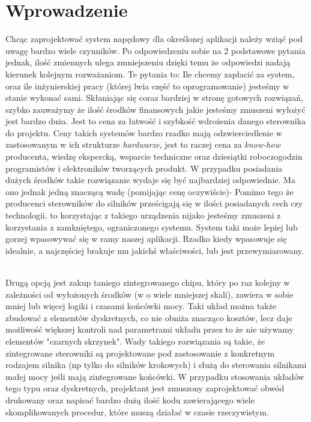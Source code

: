 \section*{Wprowadzenie}
Chcąc zaprojektować system napędowy dla określonej aplikacji należy wziąć pod uwagę bardzo wiele czynników. Po odpowiedzeniu sobie na 2 podstawowe pytania jednak, ilość zmiennych ulega zmniejszeniu dzięki temu że odpowiedzi nadają kierunek kolejnym rozważaniom. Te pytania to: Ile chcemy zapłacić za system, oraz ile inżynierskiej pracy (której lwia część to oprogramowanie) jesteśmy w stanie wykonać sami. Skłaniając się coraz bardziej w stronę gotowych rozwiązań, szybko zauważymy że ilość środków finansowych jakie jesteśmy zmuszeni wyłożyć jest bardzo duża. Jest to cena za łatwość i szybkość wdrożenia danego sterownika do projektu. Ceny takich systemów bardzo rzadko mają odzwierciedlenie w zastosowanym w ich strukturze {\it hardwarze}, jest to raczej cena za {\it know-how} producenta, wiedzę ekspercką, wsparcie techniczne oraz dziesiątki roboczogodzin programistów i elektroników tworzących produkt. W przypadku posiadania dużych środków takie rozwiązanie wydaje się być najbardziej odpowiednie. Ma ono jednak jedną znaczącą wadę (pomijając cenę oczywiście)- Pomimo tego że producenci sterowników do silników prześcigają się w ilości posiadanych cech czy technologii, to korzystając z takiego urządzenia nijako jesteśmy zmuszeni z korzystania z zamkniętego, ograniczonego systemu. System taki może lepiej lub gorzej wpasowywać się w ramy naszej aplikacji. Rzadko kiedy wpasowuje się idealnie, a najczęściej brakuje mu jakichś właściwości, lub jest przewymiarowany. \

Drugą opcją jest zakup taniego zintegrowanego chipu, który po raz kolejny w zależności od wyłożonych środków (w o wiele mniejszej skali), zawiera w sobie mniej lub więcej logiki i czasami końcówki mocy. Taki układ można także zbudować z elementów dyskretnych, co nie obniża znacząco kosztów, lecz daje możliwość większej kontroli nad parametrami układu przez to że nie używamy elementów "czarnych skrzynek". Wady takiego rozwiązania są takie, że zintegrowane sterowniki są projektowane pod zastosowanie z konkretnym rodzajem silnika (np tylko do silników krokowych) i służą do sterowania silnikami małej mocy jeśli mają zintegrowane końcówki. W przypadku stosowania układów tego typu oraz dyskretnych, projektant jest zmuszony zaprojektować obwód drukowany oraz napisać bardzo dużą ilość kodu zawierającego wiele skomplikowanych procedur, które muszą działać w czasie rzeczywistym. \

